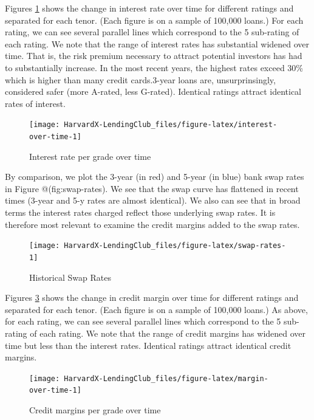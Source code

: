 \documentclass[11pt,]{report}
\begin{document}
Figures \ref{fig:interest-over-time} shows the change in interest rate over time for different ratings and separated for each tenor. (Each figure is on a sample of 100,000 loans.) For each rating, we can see several parallel lines which correspond to the 5 sub-rating of each rating. We note that the range of interest rates has substantial widened over time. That is, the risk premium necessary to attract potential investors has had to substantially increase. In the most recent years, the highest rates exceed 30\% which is higher than many credit cards.3-year loans are, unsurprinsingly, considered safer (more A-rated, less G-rated). Identical ratings attract identical rates of interest.

\begin{figure}

{\centering \texttt{[image: HarvardX-LendingClub\_files/figure-latex/interest-over-time-1]} 

}

\caption{Interest rate per grade over time}\label{fig:interest-over-time}
\end{figure}

By comparison, we plot the 3-year (in red) and 5-year (in blue) bank swap rates in Figure @(fig:swap-rates). We see that the swap curve has flattened in recent times (3-year and 5-y rates are almost identical). We also can see that in broad terms the interest rates charged reflect those underlying swap rates. It is therefore most relevant to examine the credit margins added to the swap rates.

\begin{figure}

{\centering \texttt{[image: HarvardX-LendingClub\_files/figure-latex/swap-rates-1]} 

}

\caption{Historical Swap Rates}\label{fig:swap-rates}
\end{figure}

Figures \ref{fig:margin-over-time} shows the change in credit margin over time for different ratings and separated for each tenor. (Each figure is on a sample of 100,000 loans.) As above, for each rating, we can see several parallel lines which correspond to the 5 sub-rating of each rating. We note that the range of credit margins has widened over time but less than the interest rates. Identical ratings attract identical credit margins.

\begin{figure}

{\centering \texttt{[image: HarvardX-LendingClub\_files/figure-latex/margin-over-time-1]} 

}

\caption{Credit margins per grade over time}\label{fig:margin-over-time}
\end{figure}
\end{document}
